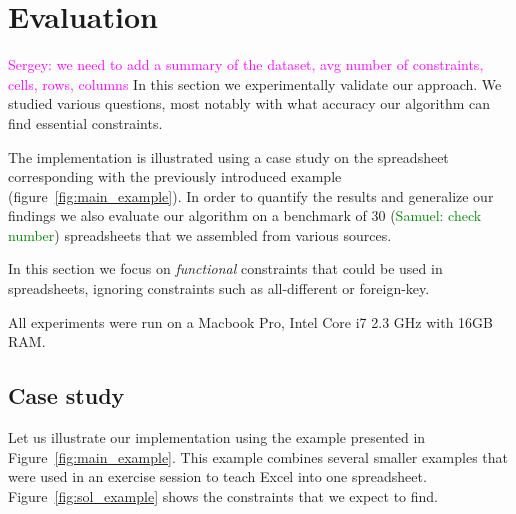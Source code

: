 \documentclass{ecai}
\newcommand{\sergey}[1]{\textcolor{magenta}{{\sc Sergey:} #1}\xspace}
\newcommand{\samuel}[1]{\textcolor{green}{{\sc Samuel:} #1}\xspace}
\begin{document}


\section{Evaluation}
\sergey{we need to add a summary of the dataset, avg number of constraints, cells, rows, columns}
In this section we experimentally validate our approach.
We studied various questions, most notably with what accuracy our algorithm can find essential constraints.

The implementation is illustrated using a case study on the spreadsheet corresponding with the previously introduced example (figure~\ref{fig:main_example}).
In order to quantify the results and generalize our findings we also evaluate our algorithm on a benchmark of 30 (\samuel{check number}) spreadsheets that we assembled from various sources.

In this section we focus on \textit{functional} constraints that could be used in spreadsheets, ignoring constraints such as all-different or foreign-key.

All experiments were run on a Macbook Pro, Intel Core i7 2.3 GHz with 16GB RAM.

\subsection{Case study}
Let us illustrate our implementation using the example presented in Figure~\ref{fig:main_example}.
This example combines several smaller examples that were used in an exercise session to teach Excel into one spreadsheet.
Figure~\ref{fig:sol_example} shows the constraints that we expect to find.
\end{document}
